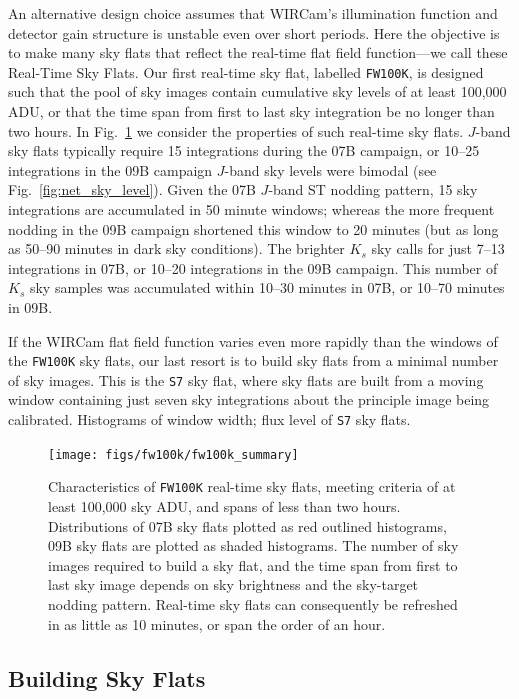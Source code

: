 \documentclass[iop]{emulateapj}
\newcommand{\todo}[1]{\textcolor{BurntOrange}{\textsf{#1}}} %
\newcommand{\Fig}[1]{Fig.~\ref{fig:#1}}  %
\begin{document}
An alternative design choice assumes that WIRCam's illumination function and detector gain structure is unstable even over short periods.
Here the objective is to make many sky flats that reflect the real-time flat field function---we call these Real-Time Sky Flats.
Our first real-time sky flat, labelled \texttt{FW100K}, is designed such that the pool of sky images contain cumulative sky levels of at least 100,000 ADU, or that the time span from first to last sky integration be no longer than two hours.
In \Fig{fw100k_summary} we consider the properties of such real-time sky flats.
$J$-band sky flats typically require 15 integrations during the 07B campaign, or 10--25 integrations in the 09B campaign $J$-band sky levels were bimodal (see \Fig{net_sky_level}).
Given the 07B $J$-band ST nodding pattern, 15 sky integrations are accumulated in 50 minute windows; whereas the more frequent nodding in the 09B campaign shortened this window to 20 minutes (but as long as 50--90 minutes in dark sky conditions).
The brighter $K_s$ sky calls for just 7--13 integrations in 07B, or 10--20 integrations in the 09B campaign.
This number of $K_s$ sky samples was accumulated within 10--30 minutes in 07B, or 10--70 minutes in 09B.

If the WIRCam flat field function varies even more rapidly than the windows of the \texttt{FW100K} sky flats, our last resort is to build sky flats from a minimal number of sky images.
This is the \texttt{S7} sky flat, where sky flats are built from a moving window containing just seven sky integrations about the principle image being calibrated.
\todo{Histograms of window width; flux level of \texttt{S7} sky flats}.

\begin{figure}[t]
\centering
\texttt{[image: figs/fw100k/fw100k\_summary]}
\caption{Characteristics of \texttt{FW100K} real-time sky flats, meeting criteria of at least 100,000 sky ADU, and spans of less than two hours.
Distributions of 07B sky flats plotted as red outlined histograms, 09B sky flats are plotted as shaded histograms.
The number of sky images required to build a sky flat, and the time span from first to last sky image depends on sky brightness and the sky-target nodding pattern.
Real-time sky flats can consequently be refreshed in as little as 10 minutes, or span the order of an hour.}
\label{fig:fw100k_summary}
\end{figure}

\subsection{Building Sky Flats}
\label{sec:flatbuilding}
\end{document}
